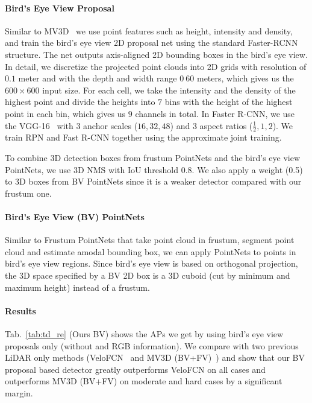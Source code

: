 \paragraph{Bird's Eye View Proposal} Similar to MV3D~\cite{cvpr17chen} we use point features such as height, intensity and density, and train the bird's eye view 2D proposal net using the standard Faster-RCNN~\cite{ren2015faster} structure. The net outputs axis-aligned 2D bounding boxes in the bird's eye view. In detail, we discretize the projected point clouds into 2D grids with resolution of $0.1$ meter and with the depth and width range $0 ~ 60$ meters, which gives us the $600\times600$ input size. For each cell, we take the intensity and the density of the highest point and divide the heights into $7$ bins with the height of the highest point in each bin, which gives us $9$ channels in total. In Faster R-CNN, we use the VGG-16~\cite{simonyan2014very} with $3$ anchor scales ($16, 32, 48$) and $3$ aspect ratios ($\frac{1}{2}, 1, 2$). We train RPN and Fast R-CNN together using the approximate joint training.

To combine 3D detection boxes from frustum PointNets and the bird's eye view PointNets, we use 3D NMS with IoU threshold $0.8$. We also apply a weight (0.5) to 3D boxes from BV PointNets since it is a weaker detector compared with our frustum one.

\paragraph{Bird's Eye View (BV) PointNets} Similar to Frustum PointNets that take point cloud in frustum, segment point cloud and estimate amodal bounding box, we can apply PointNets to points in bird's eye view regions. Since bird's eye view is based on orthogonal projection, the 3D space specified by a BV 2D box is a 3D cuboid (cut by minimum and maximum height) instead of a frustum.

\paragraph{Results} Tab.~\ref{tab:td_re} (Ours BV) shows the APs we get by using bird's eye view proposals only (without and RGB information). We compare with two previous LiDAR only methods (VeloFCN~\cite{li2016vehicle} and MV3D (BV+FV)~\cite{cvpr17chen}) and show that our BV proposal based detector greatly outperforms VeloFCN on all cases and outperforms MV3D (BV+FV) on moderate and hard cases by a significant margin.

